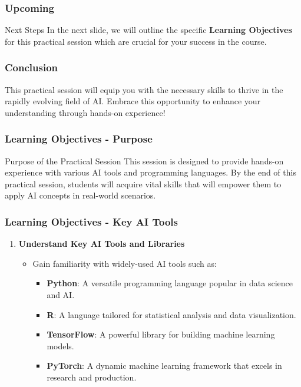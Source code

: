 \documentclass{beamer}
\begin{document}
\begin{frame}[fragile]
    \frametitle{Upcoming}
    \begin{block}{Next Steps}
        In the next slide, we will outline the specific \textbf{Learning Objectives} for this practical session which are crucial for your success in the course.
    \end{block}
\end{frame}

\begin{frame}[fragile]
    \frametitle{Conclusion}
    This practical session will equip you with the necessary skills to thrive in the rapidly evolving field of AI. Embrace this opportunity to enhance your understanding through hands-on experience!
\end{frame}

\begin{frame}
    \frametitle{Learning Objectives - Purpose}
    \begin{block}{Purpose of the Practical Session}
        This session is designed to provide hands-on experience with various AI tools and programming languages. By the end of this practical session, students will acquire vital skills that will empower them to apply AI concepts in real-world scenarios.
    \end{block}
\end{frame}

\begin{frame}
    \frametitle{Learning Objectives - Key AI Tools}
    \begin{enumerate}
        \item \textbf{Understand Key AI Tools and Libraries}
        \begin{itemize}
            \item Gain familiarity with widely-used AI tools such as:
                \begin{itemize}
                    \item \textbf{Python}: A versatile programming language popular in data science and AI.
                    \item \textbf{R}: A language tailored for statistical analysis and data visualization.
                    \item \textbf{TensorFlow}: A powerful library for building machine learning models.
                    \item \textbf{PyTorch}: A dynamic machine learning framework that excels in research and production.
                \end{itemize}
            \end{itemize}
    \end{enumerate}
\end{frame}
\end{document}
